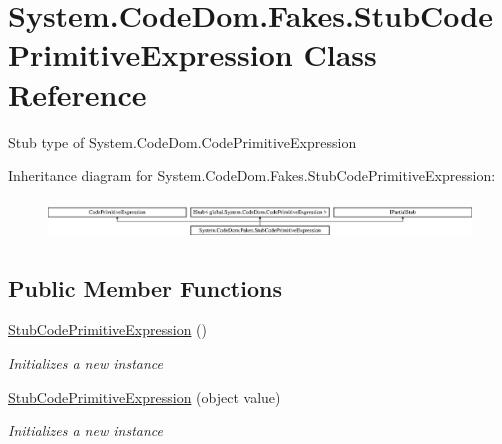 \hypertarget{class_system_1_1_code_dom_1_1_fakes_1_1_stub_code_primitive_expression}{\section{System.\-Code\-Dom.\-Fakes.\-Stub\-Code\-Primitive\-Expression Class Reference}
\label{class_system_1_1_code_dom_1_1_fakes_1_1_stub_code_primitive_expression}
}


Stub type of System.\-Code\-Dom.\-Code\-Primitive\-Expression 


Inheritance diagram for System.\-Code\-Dom.\-Fakes.\-Stub\-Code\-Primitive\-Expression\-:\begin{figure}[H]
\begin{center}
\leavevmode
\includegraphics[height=1.057601cm]{class_system_1_1_code_dom_1_1_fakes_1_1_stub_code_primitive_expression}
\end{center}
\end{figure}
\subsection*{Public Member Functions}
\begin{DoxyCompactItemize}
\item 
\hyperlink{class_system_1_1_code_dom_1_1_fakes_1_1_stub_code_primitive_expression_a67126457d46e3d8aff3d96e3809a0237}{Stub\-Code\-Primitive\-Expression} ()
\begin{DoxyCompactList}\small\item\em Initializes a new instance\end{DoxyCompactList}\item 
\hyperlink{class_system_1_1_code_dom_1_1_fakes_1_1_stub_code_primitive_expression_a504fb2ea42f16fd62ce9f57325430b33}{Stub\-Code\-Primitive\-Expression} (object value)
\begin{DoxyCompactList}\small\item\em Initializes a new instance\end{DoxyCompactList}\end{DoxyCompactItemize}

